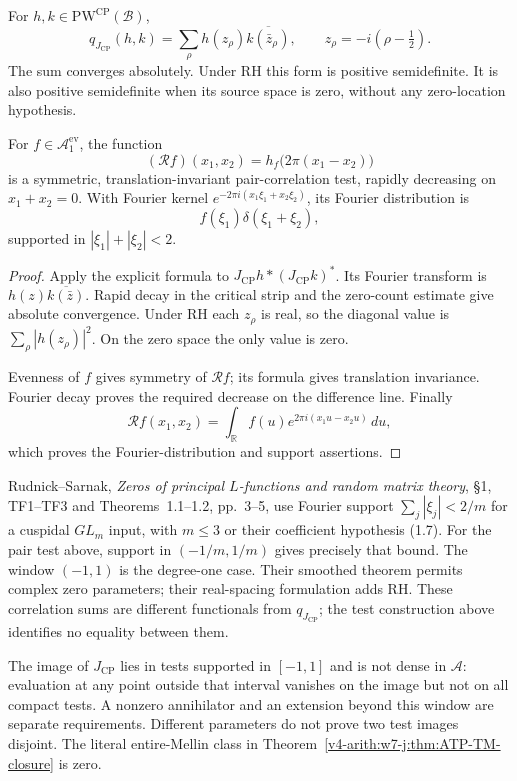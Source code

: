\begin{theorem}
\label{v4-arith:w8-atp:thm:Quant-A-TP-RS}
For $h,k\in\mathrm{PW}^{\mathrm{CP}}(\mathcal B)$,
\[
 q_{J_{\mathrm{CP}}}(h,k)
 =\sum_\rho h(z_\rho)\overline{k(\bar z_\rho)},
 \qquad z_\rho=-i(\rho-\tfrac12).
\]
The sum converges absolutely. Under RH this form is positive
semidefinite. It is also positive semidefinite when its source
space is zero, without any zero-location hypothesis.

For $f\in\mathscr A_1^{\mathrm{ev}}$, the function
\[
 (\mathcal R f)(x_1,x_2)
 =h_f\bigl(2\pi(x_1-x_2)\bigr)
\]
is a symmetric, translation-invariant pair-correlation test,
rapidly decreasing on $x_1+x_2=0$. With Fourier kernel
$e^{-2\pi i(x_1\xi_1+x_2\xi_2)}$, its Fourier distribution is
\[
 f(\xi_1)\delta(\xi_1+\xi_2),
\]
supported in $|\xi_1|+|\xi_2|<2$.
\end{theorem}
\begin{proof}
Apply the explicit formula to
$J_{\mathrm{CP}}h*(J_{\mathrm{CP}}k)^*$.
Its Fourier transform is $h(z)\overline{k(\bar z)}$.
Rapid decay in the critical strip and the zero-count estimate
give absolute convergence. Under RH each $z_\rho$ is real,
so the diagonal value is $\sum_\rho|h(z_\rho)|^2$.
On the zero space the only value is zero.

Evenness of $f$ gives symmetry of $\mathcal Rf$; its formula
gives translation invariance. Fourier decay proves the required
decrease on the difference line. Finally
\[
 \mathcal Rf(x_1,x_2)
 =\int_{\mathbb R}f(u)e^{2\pi i(x_1u-x_2u)}\,du,
\]
which proves the Fourier-distribution and support assertions.
\end{proof}

Rudnick--Sarnak, \emph{Zeros of principal $L$-functions and random
matrix theory}, \S1, TF1--TF3 and Theorems~1.1--1.2, pp.~3--5,
use Fourier support $\sum_j|\xi_j|<2/m$ for a cuspidal $GL_m$ input,
with $m\leq3$ or their coefficient hypothesis (1.7). For the pair test
above, support in $(-1/m,1/m)$ gives precisely that bound.
The window $(-1,1)$ is the degree-one case. Their smoothed theorem
permits complex zero parameters; their real-spacing formulation
adds RH. These correlation sums are different functionals from
$q_{J_{\mathrm{CP}}}$; the test construction above identifies no
equality between them.

\begin{remark}
\label{v4-arith:w8-atp:rem:Quant-RS-narrow}
The image of $J_{\mathrm{CP}}$ lies in tests supported in
$[-1,1]$ and is not dense in $\mathscr A$: evaluation at any
point outside that interval vanishes on the image but not on
all compact tests. A nonzero annihilator and an extension beyond
this window are separate requirements. Different parameters
do not prove two test images disjoint. The literal entire-Mellin
class in Theorem~\ref{v4-arith:w7-j:thm:ATP-TM-closure} is zero.
\end{remark}

